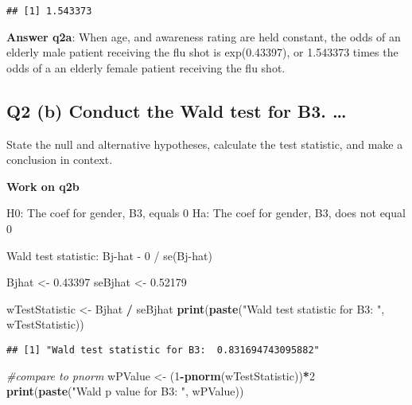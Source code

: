 \documentclass[
]{article}
\newenvironment{Shaded}{\begin{snugshade}}{\end{snugshade}}
\newcommand{\CommentTok}[1]{\textcolor[rgb]{0.56,0.35,0.01}{\textit{#1}}}
\newcommand{\DecValTok}[1]{\textcolor[rgb]{0.00,0.00,0.81}{#1}}
\newcommand{\FloatTok}[1]{\textcolor[rgb]{0.00,0.00,0.81}{#1}}
\newcommand{\KeywordTok}[1]{\textcolor[rgb]{0.13,0.29,0.53}{\textbf{#1}}}
\newcommand{\NormalTok}[1]{#1}
\newcommand{\OperatorTok}[1]{\textcolor[rgb]{0.81,0.36,0.00}{\textbf{#1}}}
\newcommand{\StringTok}[1]{\textcolor[rgb]{0.31,0.60,0.02}{#1}}
\begin{document}
\begin{verbatim}
## [1] 1.543373
\end{verbatim}

\textbf{Answer q2a}: When age, and awareness rating are held constant,
the odds of an elderly male patient receiving the flu shot is
exp(0.43397), or 1.543373 times the odds of a an elderly female patient
receiving the flu shot.

\hypertarget{q2-b-conduct-the-wald-test-for-b3.}{%
\subsection{Q2 (b) Conduct the Wald test for B3.
\ldots{}}\label{q2-b-conduct-the-wald-test-for-b3.}}

State the null and alternative hypotheses, calculate the test statistic,
and make a conclusion in context.

\textbf{Work on q2b}

H0: The coef for gender, B3, equals 0 Ha: The coef for gender, B3, does
not equal 0

Wald test statistic: Bj-hat - 0 / se(Bj-hat)

\begin{Shaded}
\begin{Highlighting}[]
\NormalTok{Bjhat <-}\StringTok{ }\FloatTok{0.43397}
\NormalTok{seBjhat <-}\StringTok{ }\FloatTok{0.52179}

\NormalTok{wTestStatistic <-}\StringTok{ }\NormalTok{Bjhat }\OperatorTok{/}\StringTok{ }\NormalTok{seBjhat}
\KeywordTok{print}\NormalTok{(}\KeywordTok{paste}\NormalTok{(}\StringTok{"Wald test statistic for B3: "}\NormalTok{, wTestStatistic))}
\end{Highlighting}
\end{Shaded}

\begin{verbatim}
## [1] "Wald test statistic for B3:  0.831694743095882"
\end{verbatim}

\begin{Shaded}
\begin{Highlighting}[]
\CommentTok{#compare to pnorm}
\NormalTok{wPValue <-}\StringTok{ }\NormalTok{(}\DecValTok{1}\OperatorTok{-}\KeywordTok{pnorm}\NormalTok{(wTestStatistic))}\OperatorTok{*}\DecValTok{2}
\KeywordTok{print}\NormalTok{(}\KeywordTok{paste}\NormalTok{(}\StringTok{"Wald p value for B3: "}\NormalTok{, wPValue))}
\end{Highlighting}
\end{Shaded}
\end{document}
